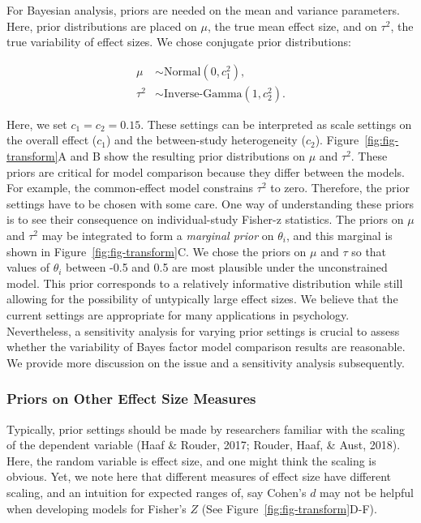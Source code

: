 \documentclass[english,,man]{apa6}
\begin{document}
For Bayesian analysis, priors are needed on the mean and variance parameters. Here, prior distributions are placed on \(\mu\), the true mean effect size, and on \(\tau^2\), the true variability of effect sizes. We chose conjugate prior distributions:

\begin{align*}
\mu &\sim \mbox{Normal}(0, c_1^2),\\
\tau^2 &\sim \mbox{Inverse-Gamma}(1, c_2^2).
\end{align*}

Here, we set \(c_1 = c_2 = 0.15\). These settings can be interpreted as scale settings on the overall effect (\(c_1\)) and the between-study heterogeneity (\(c_2\)). Figure~\ref{fig:fig-transform}A and B show the resulting prior distributions on \(\mu\) and \(\tau^2\). These priors are critical for model comparison because they differ between the models. For example, the common-effect model constrains \(\tau^2\) to zero. Therefore, the prior settings have to be chosen with some care. One way of understanding these priors is to see their consequence on individual-study Fisher-z statistics. The priors on \(\mu\) and \(\tau^2\) may be integrated to form a \emph{marginal prior} on \(\theta_i\), and this marginal is shown in Figure~\ref{fig:fig-transform}C. We chose the priors on \(\mu\) and \(\tau\) so that values of \(\theta_i\) between -0.5 and 0.5 are most plausible under the unconstrained model. This prior corresponds to a relatively informative distribution while still allowing for the possibility of untypically large effect sizes. We believe that the current settings are appropriate for many applications in psychology. Nevertheless, a sensitivity analysis for varying prior settings is crucial to assess whether the variability of Bayes factor model comparison results are reasonable. We provide more discussion on the issue and a sensitivity analysis subsequently.

\hypertarget{priors-on-other-effect-size-measures}{%
\subsubsection{Priors on Other Effect Size Measures}\label{priors-on-other-effect-size-measures}}

Typically, prior settings should be made by researchers familiar with the scaling of the dependent variable (Haaf \& Rouder, 2017; Rouder, Haaf, \& Aust, 2018). Here, the random variable is effect size, and one might think the scaling is obvious. Yet, we note here that different measures of effect size have different scaling, and an intuition for expected ranges of, say Cohen's \(d\) may not be helpful when developing models for Fisher's \(Z\) (See Figure~\ref{fig:fig-transform}D-F).
\end{document}
